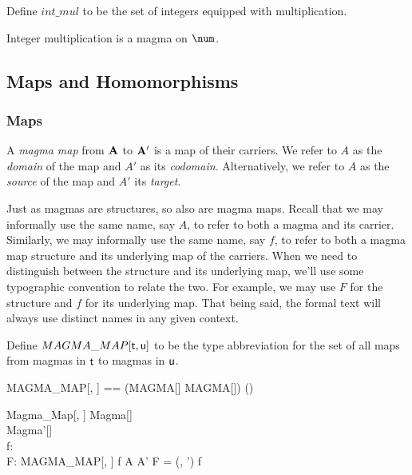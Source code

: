 \documentclass{amsart}
\begin{document}
\begin{example}

Define $int\_mul$ to be the set of integers equipped with multiplication.


Integer multiplication is a magma on $\num$.


\end{example}

\subsection{Maps and Homomorphisms}

\subsubsection{Maps}

A \textit{magma map} from $\mathbf{A}$ to $\mathbf{A}'$ is a map of their carriers.
We refer to $A$ as the \textit{domain} of the map and $A'$ as its \textit{codomain}.
Alternatively, we refer to $A$ as the \textit{source} of the map and $A'$ its \textit{target}.

Just as magmas are structures, so also are magma maps.
Recall that we may informally use the same name, say $A$, to refer to both a magma and its carrier.
Similarly, we may informally use the same name, say $f$, to refer to both a magma map
structure and its underlying map of the carriers.
When we need to distinguish between the structure and its underlying map,
we'll use some typographic convention to relate the two.
For example, we may use $F$ for the structure and $f$ for its underlying map.
That being said, the formal text will always use distinct names in any given context.

Define $MAGMA\_MAP[\mathsf{t}, \mathsf{u}]$ to be the type abbreviation for the set of
all maps from magmas in $\mathsf{t}$ to magmas in $\mathsf{u}$.

\begin{zed}
	MAGMA\_MAP[\genT, \genU] == (MAGMA[\genT] \cross MAGMA[\genU]) \cross (\genT \pfun \genU)
\end{zed}

\begin{schema}{Magma\_Map}[\genT, \genU]
	Magma[\genT] \\
	Magma'[\genU] \\
	f: \genT \pfun \genU \\
	F: MAGMA\_MAP[\genT, \genU]
\where
	f \in A \fun A'
\also
	F = (\strucA, \strucA') \mapsto f
\end{schema}
\end{document}
